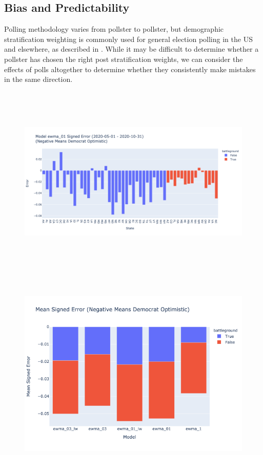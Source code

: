 \begin{table}[H]
    \centering
    
    \label{tab:aggregate_polling_2020-05-01_-_2020-10-31_mean_sample_size}
\end{table}

\subsection{Bias and Predictability}
Polling methodology varies from pollster to pollster, but demographic stratification weighting is commonly used for general election polling in the US and elsewhere, as described in \cite{Lauderdale2020ModelbasedPP}. While it may be difficult to determine whether a pollster has chosen the right post stratification weights, we can consider the effects of polls altogether to determine whether they consistently make mistakes in the same direction. 

\begin{figure}[H]
    \centering
    \includegraphics[height=25em]{figures/ewma_01_2020-05-01-2020-10-31_signed_error.png}
    \label{fig:ewma_01_2020-05-01-2020-10-31_signed_error}
\end{figure}


\begin{figure}[H]
    \centering
    \includegraphics[height=26em]{figures/ewma_03_lw_ewma_03_ewma_01_lw_ewma_01_ewma_1_mean_signed_error.png}
    \label{fig:ewma_03_lw_ewma_03_ewma_01_lw_ewma_01_ewma_1_mean_signed_error}
\end{figure}
